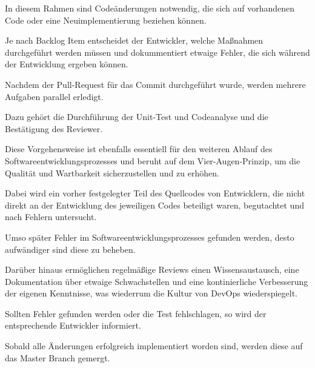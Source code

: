 In diesem Rahmen sind Codeänderungen notwendig, die sich auf vorhandenen Code oder eine Neuimplementierung beziehen können. 

Je nach Backlog Item entscheidet der Entwickler, welche Maßnahmen durchgeführt werden müssen und dokummentiert etwaige Fehler, die sich während der Entwicklung ergeben können. 

Nachdem der Pull-Request für das Commit durchgeführt wurde, werden mehrere Aufgaben parallel erledigt. 

Dazu gehört die Durchführung der Unit-Test und Codeanalyse und die Bestätigung des Reviewer.

Diese Vorgehensweise ist ebenfalls essentiell für den weiteren Ablauf des Softwareentwicklungsprozesses und beruht auf dem Vier-Augen-Prinzip, um die Qualität und Wartbarkeit sicherzustellen und zu erhöhen.  

Dabei wird ein vorher festgelegter Teil des Quellcodes von Entwicklern, die nicht direkt an der Entwicklung des jeweiligen Codes beteiligt waren, begutachtet und nach Fehlern untersucht. 

Umso später Fehler im Softwareentwicklungsprozesses gefunden werden, desto aufwändiger sind diese zu beheben. 

Darüber hinaus ermöglichen regelmäßige Reviews einen Wissensaustausch, eine Dokumentation über etwaige Schwachstellen und eine kontinierliche Verbesserung der eigenen Kenntnisse, was wiederrum die Kultur von DevOps wiederspiegelt. 

Sollten Fehler gefunden werden oder die Test fehlschlagen, so wird der entsprechende Entwickler informiert. 

Sobald alle Änderungen erfolgreich implementiert worden sind, werden diese auf das Master Branch gemergt. 

